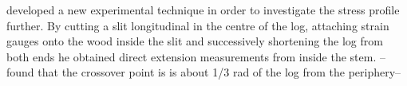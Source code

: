 \cite{boyd1950a} developed a new experimental technique in order to investigate the
stress profile further. By cutting a slit longitudinal in the centre of the
log, attaching strain gauges onto the wood inside the slit and successively
shortening the log from both ends he obtained direct extension measurements from
inside the stem. --found that the crossover point is is about 1/3 rad of the log
from the periphery--